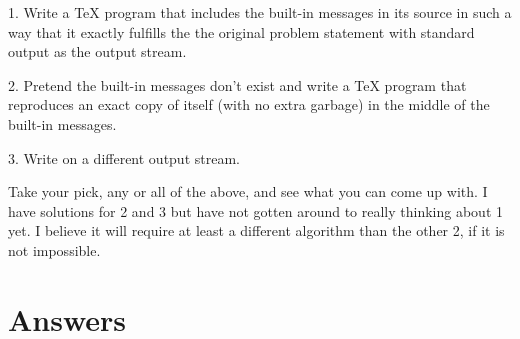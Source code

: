 1. Write a TeX program that includes the built-in messages in its
source in such a way that it exactly fulfills the the original problem
statement with standard output as the output stream.

2. Pretend the built-in messages don't exist and write a TeX program
that reproduces an exact copy of itself (with no extra garbage)
in the middle of the built-in messages.

3. Write on a different output stream.

Take your pick, any or all of the above, and see what you can come up
with. I have solutions for 2 and 3 but have not gotten around to really
thinking about 1 yet. I believe it will require at least a different
algorithm than the other 2, if it is not impossible.


\section{Answers}

